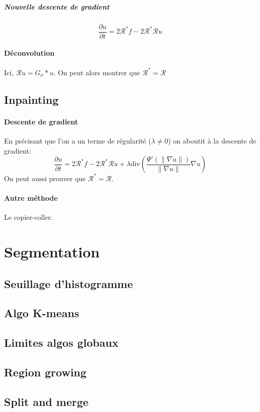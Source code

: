 \documentclass[french]{article}
\begin{document}
\subparagraph{Nouvelle descente de gradient}
$$\frac{\partial u}{\partial t} = 2\mathcal{R}^* f - 2 \mathcal{R}^*\mathcal{R} u$$

\paragraph{Déconvolution} Ici, $\mathcal{R} u = G_\sigma * u$. On peut alors
montrer que $\mathcal{R}^* = \mathcal{R}$

\subsection{Inpainting}
\paragraph{Descente de gradient} En précisant que l'on a un terme de régularité
($\lambda \neq 0$) on aboutit à la descente de gradient:
$$\frac{\partial u}{\partial t} = 2\mathcal{R}^* f - 2 \mathcal{R}^*\mathcal{R} u
+ \lambda \text{div}\left( \frac{\Psi'(\|\nabla u\|)}{\|\nabla u\|} \nabla u\right)$$
On peut aussi prouver que $\mathcal{R}^* = \mathcal{R}$.

\paragraph{Autre méthode} Le copier-coller.

\section{Segmentation}
\subsection{Seuillage d'histogramme}
\subsection{Algo K-means}
\subsection{Limites algos globaux}
\subsection{Region growing}
\subsection{Split and merge}
\end{document}
